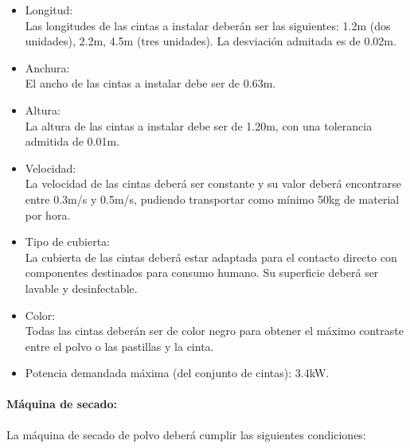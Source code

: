 		\begin{itemize}
			\item{Longitud:}\\
			Las longitudes de las cintas a instalar deberán ser las siguientes: 1.2m (dos unidades), 2.2m, 4.5m (tres unidades). La desviación admitada es de 0.02m.  

			\item{Anchura:}\\
			El ancho de las cintas a instalar debe ser de 0.63m.

			\item{Altura:}\\
			La altura de las cintas a instalar debe ser de 1.20m, con una tolerancia admitida de 0.01m.
			
			\item{Velocidad:}\\
			La velocidad de las cintas deberá ser constante y su valor deberá encontrarse entre 0.3m/s y 0.5m/s, pudiendo transportar como mínimo 50kg de material por hora. 
			
			\item{Tipo de cubierta: }\\
			La cubierta de las cintas deberá estar adaptada para el contacto directo con componentes destinados para consumo humano. Su superficie deberá ser lavable y desinfectable.

			\item{Color: }\\
			Todas las cintas deberán ser de color negro para obtener el máximo contraste entre el polvo o las pastillas y la cinta.

			\item{Potencia demandada máxima (del conjunto de cintas):} 3.4kW.
		
		\end{itemize}

\paragraph{Máquina de secado:}
		La máquina de secado de polvo deberá cumplir las siguientes condiciones:
		
